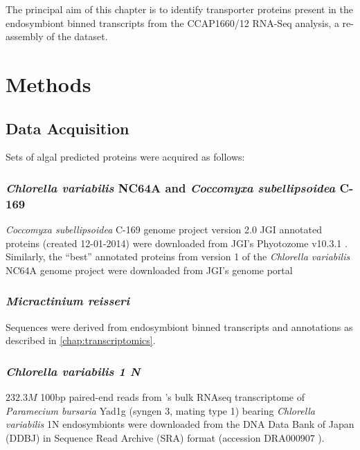 The principal aim of this chapter is to identify
transporter proteins present in the endosymbiont
binned transcripts from the CCAP1660/12 RNA-Seq analysis,
a re-assembly of the \citep{Kodama2014c} dataset.

\section{Methods}

\subsection{Data Acquisition}

Sets of algal predicted proteins were acquired as follows:

\subsubsection{\textit{Chlorella variabilis} NC64A and \textit{Coccomyxa subellipsoidea} C-169} 
 
\textit{Coccomyxa subellipsoidea} C-169 genome project \citep{Blanc2012} version 2.0 
JGI annotated proteins (created 12-01-2014) were downloaded from JGI's
Phyotozome v10.3.1 \citep{Goodstein2012}. 
Similarly, the ``best'' annotated proteins from
version 1 of the \textit{Chlorella variabilis} NC64A genome project \citep{Blanc2010}
were downloaded from JGI's genome portal \citep{Grigoriev2011,Nordberg2014}

\subsubsection{\textit{Micractinium reisseri}}

Sequences were derived from endosymbiont binned
transcripts and annotations as described in \ref{chap:transcriptomics}.

\subsubsection{\textit{Chlorella variabilis 1 N}}

\(232.3M\) 100bp paired-end reads from \citep{Kodama2014}'s 
bulk RNAseq transcriptome of \textit{Paramecium bursaria} Yad1g (syngen
3, mating type 1) bearing \textit{Chlorella variabilis} 1N endosymbionts
were downloaded from the DNA Data Bank of Japan (DDBJ) \citep{Tateno2002,Kaminuma2011}
in Sequence Read Archive (SRA) format \citep{Leinonen2011,KodamaNRA2012b} (accession DRA000907 \citep{Kodama2014}).

